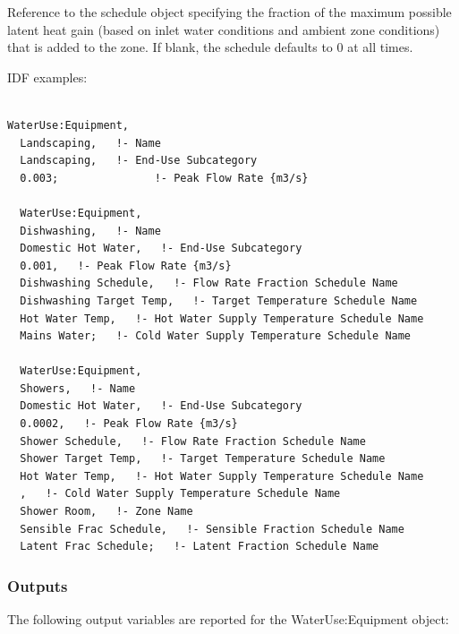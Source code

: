 Reference to the schedule object specifying the fraction of the maximum possible latent heat gain (based on inlet water conditions and ambient zone conditions) that is added to the zone. If blank, the schedule defaults to 0 at all times.

IDF examples:

\begin{lstlisting}

WaterUse:Equipment,
  Landscaping,   !- Name
  Landscaping,   !- End-Use Subcategory
  0.003;               !- Peak Flow Rate {m3/s}

  WaterUse:Equipment,
  Dishwashing,   !- Name
  Domestic Hot Water,   !- End-Use Subcategory
  0.001,   !- Peak Flow Rate {m3/s}
  Dishwashing Schedule,   !- Flow Rate Fraction Schedule Name
  Dishwashing Target Temp,   !- Target Temperature Schedule Name
  Hot Water Temp,   !- Hot Water Supply Temperature Schedule Name
  Mains Water;   !- Cold Water Supply Temperature Schedule Name

  WaterUse:Equipment,
  Showers,   !- Name
  Domestic Hot Water,   !- End-Use Subcategory
  0.0002,   !- Peak Flow Rate {m3/s}
  Shower Schedule,   !- Flow Rate Fraction Schedule Name
  Shower Target Temp,   !- Target Temperature Schedule Name
  Hot Water Temp,   !- Hot Water Supply Temperature Schedule Name
  ,   !- Cold Water Supply Temperature Schedule Name
  Shower Room,   !- Zone Name
  Sensible Frac Schedule,   !- Sensible Fraction Schedule Name
  Latent Frac Schedule;   !- Latent Fraction Schedule Name
\end{lstlisting}

\subsubsection{Outputs}\label{outputs-041}

The following output variables are reported for the WaterUse:Equipment object:

